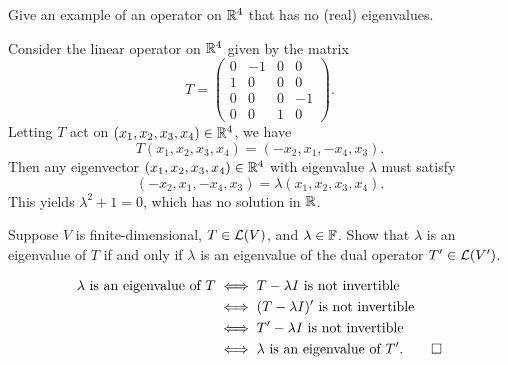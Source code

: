 \begin{exc}
\begin{exercise}
Give an example of an operator on $\mathbb{R}^4$ that has no (real) eigenvalues.
\end{exercise}
\begin{solution}
Consider the linear operator on $\mathbb{R}^4$ given by the matrix
\[ T = \begin{pmatrix} 0&-1&0&0\\ 1&0&0&0\\ 0&0&0&-1\\ 0&0&1&0 \end{pmatrix}.
\]
Letting $T$ act on $(x_1,x_2,x_3,x_4)\in\mathbb{R}^4$, we have
\[ T(x_1,x_2,x_3,x_4) = (-x_2,x_1,-x_4,x_3). \]
Then any eigenvector $(x_1,x_2,x_3,x_4)\in\mathbb{R}^4$ with eigenvalue $\lambda$ must
satisfy
\[ (-x_2,x_1,-x_4,x_3) = \lambda(x_1,x_2,x_3,x_4). \]
This yields $\lambda^2+1=0$, which has no solution in $\mathbb{R}$.
\end{solution}

\begin{exercise}
Suppose $V$ is finite-dimensional, $T\in\mathcal{L}(V)$, and $\lambda\in\mathbb{F}$. Show that
$\lambda$ is an eigenvalue of $T$ if and only if $\lambda$ is an eigenvalue of
the dual operator $T'\in\mathcal{L}(V')$.
\end{exercise}
\begin{solution}
\begin{align*}
\lambda\text{ is an eigenvalue of }T
  &\iff T-\lambda I\text{ is not invertible}\\
  &\iff (T-\lambda I)'\text{ is not invertible}\\
  &\iff T'-\lambda I\text{ is not invertible}\\
  &\iff \lambda\text{ is an eigenvalue of }T'. \qedhere
\end{align*}
\end{solution}


\end{exc}
